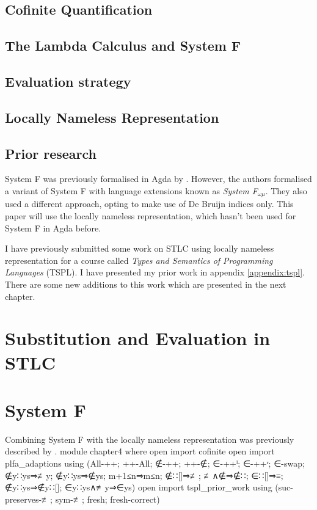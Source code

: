 \documentclass[logo,bsc,singlespacing,parskip,online]{infthesis}
\renewenvironment{code}{\mintedcopy[breaklines,breaksymbolleft=\;]{agda}}{\endmintedcopy}
\begin{document}
\section{Cofinite Quantification}



\section{The Lambda Calculus and System F}


\section{Evaluation strategy}
\label{background:evaluation_strategy}


\section{Locally Nameless Representation}


\section{Prior research}
System F was previously formalised in Agda by \citet{hutton_system_2019}. However, the authors
formalised a variant of System F with language extensions known as \textit{System F$_{\omega \mu}$}.
They also used a different approach, opting to make use of De Bruijn indices only. This paper will
use the locally nameless representation, which hasn't been used for System F in Agda before.

I have previously submitted some work on STLC using locally nameless representation for a course
called \textit{Types and Semantics of Programming Languages} (TSPL). I have presented my prior work
in appendix \ref{appendix:tspl}. There are some new additions to this work which are presented in
the next chapter.

\chapter{Substitution and Evaluation in STLC}
\label{chapter3:stlc_sub_and_eval}


\chapter{System F}
Combining System F with the locally nameless representation was previously described by
\citet{chargueraud_locally_2012}.
\begin{code}
module chapter4 where
  open import cofinite
  open import plfa_adaptions using (All-++; ++-All; ∉-++; ++-∉; ∈-++ˡ; ∈-++ʳ; ∈-swap;
    ∉y∷ys⇒≢y; ∉y∷ys⇒∉ys; m+1≤n⇒m≤n; ∉∷[]⇒≢; ≢∧∉⇒∉∷; ∈∷[]⇒≡; ∉y∷ys⇒∉y∷[];
    ∈y∷ys∧≢y⇒∈ys)
  open import tspl_prior_work
    using (suc-preserves-≢; sym-≢; fresh; fresh-correct)
\end{code}
\end{document}
